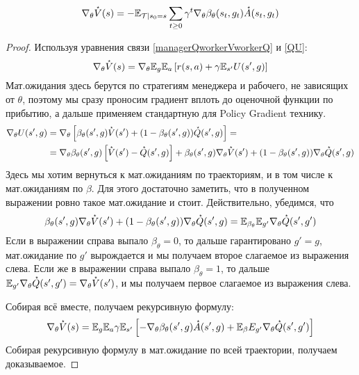 \begin{theorem}
\begin{equation}\label{terminationpg}
\nabla_{\theta} \accentset{\star}{V}(s) = -\mathbb{E}_{\mathcal{T} \mid s_0 = s} \sum_{t \ge 0} \gamma^t \nabla_\theta \beta_{\theta}(s_t, g_t) \accentset{\star}{A}(s_t, g_t)
\end{equation}
\begin{proof}
Используя уравнения связи \eqref{managerQworkerVworkerQ} и \eqref{QU}:
$$\nabla_{\theta} \accentset{\star}{V}(s) = \nabla_{\theta} \mathbb{E}_{g} \mathbb{E}_{a} \left[ r(s, a) + \gamma \mathbb{E}_{s'} U(s', g)\right]$$
Мат.ожидания здесь берутся по стратегиям менеджера и рабочего, не зависящих от $\theta$, поэтому мы сразу проносим градиент вплоть до оценочной функции по прибытию, а дальше применяем стандартную для Policy Gradient технику.
\begin{align*}
\nabla_{\theta} U(s', g) &= \nabla_{\theta} \left[\beta_{\theta}(s', g) \accentset{\star}{V}(s') + (1 - \beta_{\theta}(s', g)) \accentset{\star}{Q}(s', g) \right] = \\
 &= \nabla_{\theta} \beta_{\theta}(s', g) \left[\accentset{\star}{V}(s') - \accentset{\star}{Q}(s', g) \right] + \beta_{\theta}(s', g) \nabla_{\theta} \accentset{\star}{V}(s') + (1 - \beta_{\theta}(s', g)) \nabla_{\theta} \accentset{\star}{Q}(s', g)
\end{align*}
Здесь мы хотим вернуться к мат.ожиданиям по траекториям, и в том числе к мат.ожиданиям по $\beta$. Для этого достаточно заметить, что в полученном выражении ровно такое мат.ожидание и стоит. Действительно, убедимся, что
$$\beta_{\theta}(s', g) \nabla_{\theta} \accentset{\star}{V}(s') + (1 - \beta_{\theta}(s', g)) \nabla_{\theta} \accentset{\star}{Q}(s', g) = \mathbb{E}_{\beta_{\theta}} \mathbb{E}_{g'} \nabla_{\theta} \accentset{\star}{Q}(s', g')$$
Если в выражении справа выпало $\beta_{\theta} = 0$, то дальше гарантировано $g' = g$, мат.ожидание по $g'$ вырождается и мы получаем второе слагаемое из выражения слева. Если же в выражении справа выпало $\beta_{\theta} = 1$, то дальше $\mathbb{E}_{g'} \nabla_{\theta} \accentset{\star}{Q}(s', g') = \nabla_{\theta} \accentset{\star}{V}(s')$, и мы получаем первое слагаемое из выражения слева.

Собирая всё вместе, получаем рекурсивную формулу:
$$\nabla_{\theta} \accentset{\star}{V}(s) = \mathbb{E}_{g} \mathbb{E}_{a} \gamma \mathbb{E}_{s'}  \left[ - \nabla_{\theta}\beta_{\theta}(s', g) \accentset{\star}{A}(s', g) + \mathbb{E}_{\beta} E_{g'} \nabla_{\theta} \accentset{\star}{Q}(s', g') \right] $$
Собирая рекурсивную формулу в мат.ожидание по всей траектории, получаем доказываемое.
\end{proof}
\end{theorem}

